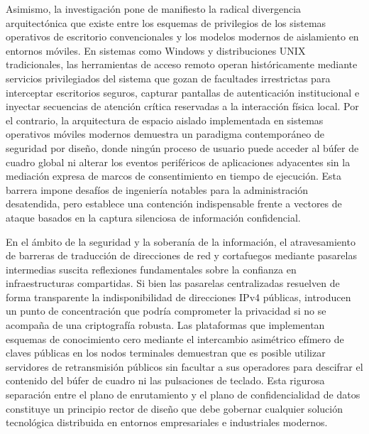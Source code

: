 \documentclass[12pt]{article}
\begin{document}
Asimismo, la investigación pone de manifiesto la radical divergencia arquitectónica que existe entre los esquemas de privilegios de los sistemas operativos de escritorio convencionales y los modelos modernos de aislamiento en entornos móviles. En sistemas como Windows y distribuciones UNIX tradicionales, las herramientas de acceso remoto operan históricamente mediante servicios privilegiados del sistema que gozan de facultades irrestrictas para interceptar escritorios seguros, capturar pantallas de autenticación institucional e inyectar secuencias de atención crítica reservadas a la interacción física local. Por el contrario, la arquitectura de espacio aislado implementada en sistemas operativos móviles modernos demuestra un paradigma contemporáneo de seguridad por diseño, donde ningún proceso de usuario puede acceder al búfer de cuadro global ni alterar los eventos periféricos de aplicaciones adyacentes sin la mediación expresa de marcos de consentimiento en tiempo de ejecución. Esta barrera impone desafíos de ingeniería notables para la administración desatendida, pero establece una contención indispensable frente a vectores de ataque basados en la captura silenciosa de información confidencial.

En el ámbito de la seguridad y la soberanía de la información, el atravesamiento de barreras de traducción de direcciones de red y cortafuegos mediante pasarelas intermedias suscita reflexiones fundamentales sobre la confianza en infraestructuras compartidas. Si bien las pasarelas centralizadas resuelven de forma transparente la indisponibilidad de direcciones IPv4 públicas, introducen un punto de concentración que podría comprometer la privacidad si no se acompaña de una criptografía robusta. Las plataformas que implementan esquemas de conocimiento cero mediante el intercambio asimétrico efímero de claves públicas en los nodos terminales demuestran que es posible utilizar servidores de retransmisión públicos sin facultar a sus operadores para descifrar el contenido del búfer de cuadro ni las pulsaciones de teclado. Esta rigurosa separación entre el plano de enrutamiento y el plano de confidencialidad de datos constituye un principio rector de diseño que debe gobernar cualquier solución tecnológica distribuida en entornos empresariales e industriales modernos.
\end{document}
